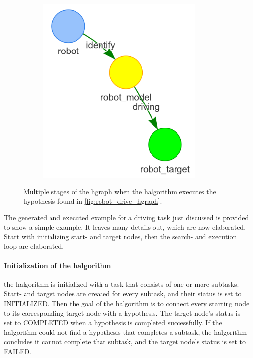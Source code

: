 \begin{figure}[h]
\begin{subfigure}{.3\textwidth}
    \end{subfigure}
    \begin{subfigure}{.3\textwidth}
    \centering
    \includegraphics[width=0.9\textwidth]{figures/proposed_method/connecting_nodes/robot_to_target/execute_robot_to_target_3}
    \end{subfigure}
    \caption{Multiple stages of the \ac{hgraph} when the \ac{halgorithm} executes the hypothesis found in \cref{fig:robot_drive_hgraph}.}
    \label{fig:execute_robot_to_target}
\end{figure}

The generated and executed example for a driving task just discussed is provided to show a simple example. It leaves many details out, which are now elaborated. Start with initializing start- and target nodes, then the search- and execution loop are elaborated.\bs

\paragraph{Initialization of the \ac{halgorithm}}
the \ac{halgorithm} is initialized with a task that consists of one or more subtasks. Start- and target nodes are created for every subtask, and their status is set to INITIALIZED. Then the goal of the \ac{halgorithm} is to connect every starting node to its corresponding target node with a hypothesis. The target node's status is set to COMPLETED when a hypothesis is completed successfully. If the \ac{halgorithm} could not find a hypothesis that completes a subtask, the \ac{halgorithm} concludes it cannot complete that subtask, and the target node's status is set to FAILED.\bs

